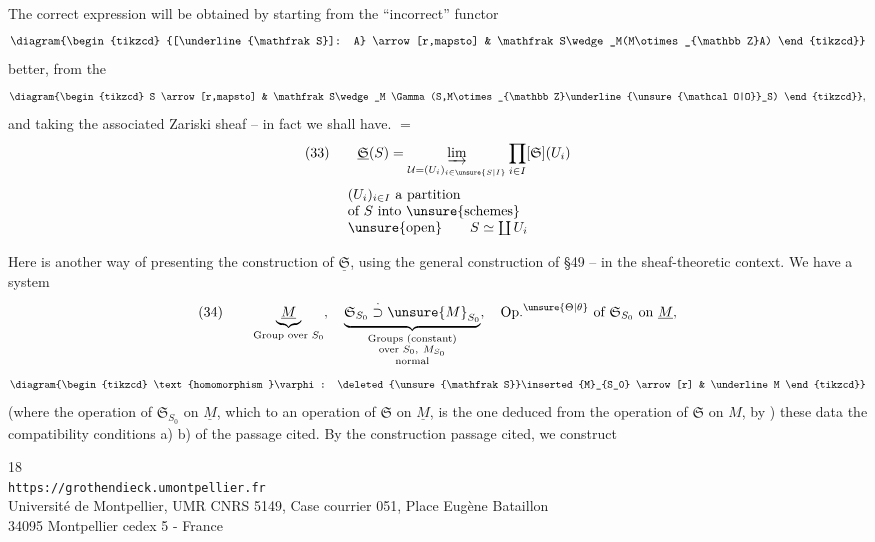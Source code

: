 The correct expression will be obtained by starting from the  ``incorrect'' functor
\[
\diagram{\begin{tikzcd}
{[\underline{\mathfrak S}]: A} \arrow[r,mapsto] &
\mathfrak S\wedge_M(M\otimes_{\mathbb Z}A)
\end{tikzcd}}
\]
 better, from the 
\[
\diagram{\begin{tikzcd}
S \arrow[r,mapsto] &
\mathfrak S\wedge_M
\Gamma(S,M\otimes_{\mathbb Z}\underline{\unsure{\mathcal O|O}}_S)
\end{tikzcd}},
\]
and taking the associated Zariski sheaf -- in fact we shall have. $=$
\[
(33)\qquad
\underline{\mathfrak S}(S)=
\underset{\mathcal U=(U_i)_{i\in\unsure{S|I}}}{\varinjlim}
\prod_{i\in I}[\mathfrak S](U_i)
\]
\[
\begin{array}{l}
(U_i)_{i\in I}\ \text{a partition}\\
\text{of }S\text{ into }\unsure{\text{schemes}}\\
\unsure{\text{open}}\qquad S\simeq\coprod U_i
\end{array}
\]

Here is another way of presenting the construction of
$\underline{\mathfrak S}$, using the general construction
of §49 -- in the sheaf-theoretic context. We have a system
\[
(34)\qquad
\underbrace{\underline M}_{\text{Group over }S_0},
\quad
\underbrace{\mathfrak S_{S_0}
\overset{\cdot}{\supset}\unsure{M}_{S_0}}_{
\substack{\text{Groups (constant)}\\
\text{over }S_0,\ M_{S_0}\\
\text{normal}}},
\quad
\mathrm{Op.}^{\unsure{\Theta|\theta}}\text{ of }
\mathfrak S_{S_0}\text{ on }\underline M,
\]
\[
\diagram{\begin{tikzcd}
\text{homomorphism }\varphi:
\deleted{\unsure{\mathfrak S}}\inserted{M}_{S_0}
\arrow[r] & \underline M
\end{tikzcd}}
\]
(where the operation of $\mathfrak S_{S_0}$ on $\underline M$,
which  to an operation of $\mathfrak S$ on $\underline M$,
is the one deduced from the operation of $\mathfrak S$ on $M$,
by )
these data  the compatibility conditions a) b)
of the passage cited. By the construction  passage cited, we construct

\begin{center}
\small
18\\
\texttt{https://grothendieck.umontpellier.fr}\\
Université de Montpellier, UMR CNRS 5149, Case courrier 051, Place Eugène Bataillon\\
34095 Montpellier cedex 5 - France
\end{center}